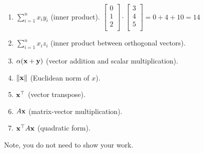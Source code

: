 \begin{enumerate}
    
    \item $\sum_{i=1}^n x_iy_i$ (inner product).
    \solution${
    
    
    \begin{bmatrix}
        
    0 \\
    1 \\
    2 \\
    \end{bmatrix}
    \cdot
    \begin{bmatrix}
    3 \\
    4 \\
    5 \\
    \end{bmatrix}
    = 0 + 4 + 10 = 14
    
    }$
    
    
    
    \item $\sum_{i=1}^n x_iz_i$ (inner product between orthogonal vectors).
    
    \item $\alpha(\mathbf{x}+\mathbf{y})$ (vector addition and scalar multiplication).

    \item $\left\|\mathbf{x} \right\|$ (Euclidean norm of $x$).
    
    \item $\mathbf{x}^\top$ (vector transpose).

    \item $A\mathbf{x}$ (matrix-vector multiplication).
    
    \item $\mathbf{x}^\top A\mathbf{x}$ (quadratic form).
\end{enumerate}
Note, you do not need to show your work. 

